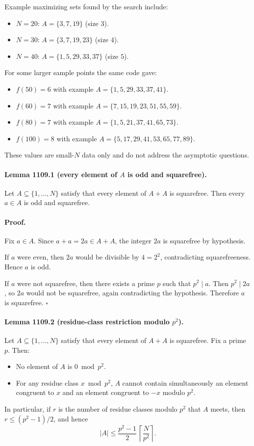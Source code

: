 Example maximizing sets found by the search include:
\begin{itemize}
\item $N=20$: $A=\{3,7,19\}$ (size $3$).
\item $N=30$: $A=\{3,7,19,23\}$ (size $4$).
\item $N=40$: $A=\{1,5,29,33,37\}$ (size $5$).
\end{itemize}
For some larger sample points the same code gave:
\begin{itemize}
\item $f(50)=6$ with example $A=\{1,5,29,33,37,41\}$.
\item $f(60)=7$ with example $A=\{7,15,19,23,51,55,59\}$.
\item $f(80)=7$ with example $A=\{1,5,21,37,41,65,73\}$.
\item $f(100)=8$ with example $A=\{5,17,29,41,53,65,77,89\}$.
\end{itemize}
These values are small-$N$ data only and do not address the asymptotic questions.

\paragraph{Lemma 1109.1 (every element of $A$ is odd and squarefree).}
Let $A\subseteq\{1,\dots,N\}$ satisfy that every element of $A+A$ is squarefree.
Then every $a\in A$ is odd and squarefree.

\paragraph{Proof.}
Fix $a\in A$. Since $a+a=2a\in A+A$, the integer $2a$ is squarefree by hypothesis.

If $a$ were even, then $2a$ would be divisible by $4=2^2$, contradicting squarefreeness. Hence $a$ is odd.

If $a$ were not squarefree, then there exists a prime $p$ such that $p^2\mid a$.
Then $p^2\mid 2a$, so $2a$ would not be squarefree, again contradicting the hypothesis.
Therefore $a$ is squarefree. \hfill $\square$

\paragraph{Lemma 1109.2 (residue-class restriction modulo $p^2$).}
Let $A\subseteq\{1,\dots,N\}$ satisfy that every element of $A+A$ is squarefree.
Fix a prime $p$.
Then:
\begin{itemize}
\item No element of $A$ is $0\bmod p^2$.
\item For any residue class $x\bmod p^2$, $A$ cannot contain simultaneously an element congruent to $x$ and an element congruent to $-x$ modulo $p^2$.
\end{itemize}
In particular, if $r$ is the number of residue classes modulo $p^2$ that $A$ meets, then $r\le (p^2-1)/2$, and hence
\[|A|\le \frac{p^2-1}{2}\,\left\lceil \frac{N}{p^2}\right\rceil.
\]

